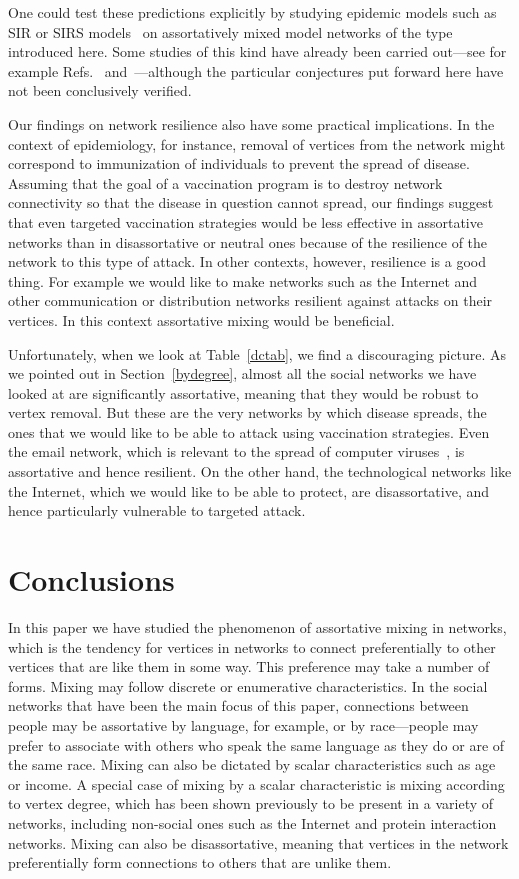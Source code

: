 \documentclass[twocolumn,pre]{revtex4}
\begin{document}
One could test these predictions explicitly by studying epidemic models
such as SIR or SIRS models~\cite{Bailey75,Hethcote00} on assortatively
mixed model networks of the type introduced here.  Some studies of this
kind have already been carried out---see for example
Refs.~ and~---although the particular
conjectures put forward here have not been conclusively verified.

Our findings on network resilience also have some practical implications.
In the context of epidemiology, for instance, removal of vertices from the
network might correspond to immunization of individuals to prevent the
spread of disease.  Assuming that the goal of a vaccination program is to
destroy network connectivity so that the disease in question cannot spread,
our findings suggest that even targeted vaccination strategies would be
less effective in assortative networks than in disassortative or neutral
ones because of the resilience of the network to this type of attack.  In
other contexts, however, resilience is a good thing.  For example we would
like to make networks such as the Internet and other communication or
distribution networks resilient against attacks on their vertices.  In this
context assortative mixing would be beneficial.

Unfortunately, when we look at Table~\ref{dctab}, we find a discouraging
picture.  As we pointed out in Section~\ref{bydegree}, almost all the
social networks we have looked at are significantly assortative, meaning
that they would be robust to vertex removal.  But these are the very
networks by which disease spreads, the ones that we would like to be able
to attack using vaccination strategies.  Even the email network, which is
relevant to the spread of computer viruses~\cite{NFB02}, is assortative and
hence resilient.  On the other hand, the technological networks like the
Internet, which we would like to be able to protect, are disassortative,
and hence particularly vulnerable to targeted attack.


\section{Conclusions}
\label{concs}
In this paper we have studied the phenomenon of assortative mixing in
networks, which is the tendency for vertices in networks to connect
preferentially to other vertices that are like them in some way.  This
preference may take a number of forms.  Mixing may follow discrete or
enumerative characteristics.  In the social networks that have been the
main focus of this paper, connections between people may be assortative by
language, for example, or by race---people may prefer to associate with
others who speak the same language as they do or are of the same race.
Mixing can also be dictated by scalar characteristics such as age or
income.  A special case of mixing by a scalar characteristic is mixing
according to vertex degree, which has been shown previously to be present
in a variety of networks, including non-social ones such as the Internet
and protein interaction networks.  Mixing can also be disassortative,
meaning that vertices in the network preferentially form connections to
others that are unlike them.
\end{document}
